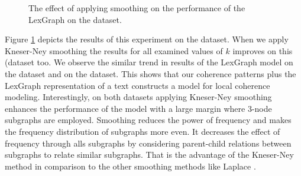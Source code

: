 \begin{figure}[!ht]
  \begin{center}
      \mydata
  \end{center}
  \caption{The effect of applying smoothing on the performance of the LexGraph on the \declercqds dataset.} 
  \label{fig:declercq-smoothing}
\end{figure}


Figure \ref{fig:declercq-smoothing} depicts the results of this experiment on the \declercqds dataset. 
When we apply Kneser-Ney smoothing the results for all examined values of $k$ improves on this (dataset too. 
We observe the similar trend in results of the LexGraph model on the \declercqds dataset and on the \pitlerds dataset. 
This shows that our coherence patterns plus the LexGraph representation of a text constructs a model for local coherence modeling. 
Interestingly, on both datasets applying Kneser-Ney smoothing enhances the performance of the model with a large margin where 3-node subgraphs are employed. 
Smoothing reduces the power of frequency and makes the frequency distribution of subgraphs more even. 
It decreases the effect of frequency through alls subgraphs by considering parent-child relations between subgraphs to relate similar subgraphs. 
That is the advantage of the \mbox{Kneser-Ney} method in comparison to the other smoothing methods like Laplace \cite{jurafsky08}. 

